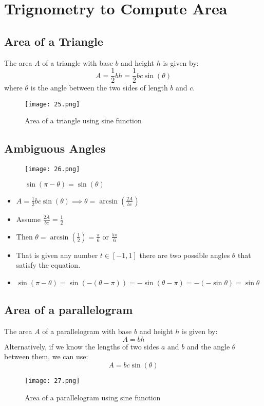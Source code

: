 \section{Trignometry to Compute Area}
\subsection{Area of a Triangle}
The area $A$ of a triangle with base $b$ and height $h$ is given by:
\[ A = \frac{1}{2} b h = \frac{1}{2} b c \sin(\theta) \]
where $\theta$ is the angle between the two sides of length $b$ and $c$.
\begin{figure}
    \centering
    \texttt{[image: 25.png]}
    \caption{Area of a triangle using sine function}
\end{figure}

\subsection{Ambiguous Angles}
\begin{figure}
    \centering
    \texttt{[image: 26.png]}
    \caption{$\sin(\pi - \theta) = \sin(\theta)$}
\end{figure}
\begin{itemize}
    \item  $A = \frac{1}{2} b c \sin(\theta) \implies \theta = \arcsin\left(\frac{2A}{bc}\right) $
    \item Assume $ \frac{2A}{bc} = \frac{1}{2} $
    \item Then $ \theta = \arcsin\left(\frac{1}{2}\right) = \frac{\pi}{6} $ or $ \frac{5\pi}{6} $
    \item That is given any number $t \in [-1,1]$ there are two possible angles $\theta$ that satisfy the equation.
    \item $\sin (\pi - \theta) = \sin(-(\theta - \pi )) = - \sin(\theta - \pi) = -(-\sin \theta) = \sin \theta $
\end{itemize}

\subsection{Area of a parallelogram}
The area $A$ of a parallelogram with base $b$ and height $h$ is given by:
\[ A = b h \]
Alternatively, if we know the lengths of two sides $a$ and $b$ and the angle $\theta$ between them, we can use:
\[ A =  bc \sin(\theta) \]
\begin{figure}
    \centering
    \texttt{[image: 27.png]}
    \caption{Area of a parallelogram using sine function}
\end{figure}


